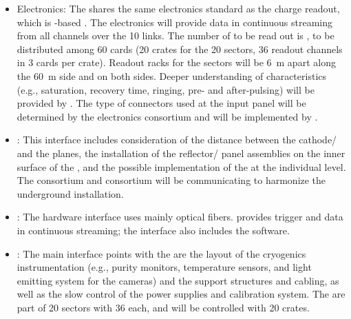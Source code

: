 
\begin{itemize}

\item {} Electronics: The  shares the same  electronics standard as the charge readout, which is -based \cite{utca}. The  electronics will provide data in continuous streaming %
from all  channels over the \SI{10}{\Gbps} links. The number of %
to be read out is \dpnumpmtch, to be distributed among \num{60}  cards (\num{20}  crates for the \num{20}  sectors, \num{36} readout channels in \num{3}  cards per crate). Readout racks for the sectors will be \SI{6}{\m} apart along the \SI{60}{\m} side and on both sides. Deeper understanding of  characteristics
 (e.g., saturation, recovery time, ringing, pre- and after-pulsing) will be provided by  . The type of connectors used at the  input panel will be determined by the  electronics consortium and will be implemented by  .

\item {}: This interface includes consideration of the distance between the cathode/ and the  planes, the installation of the reflector/ panel assemblies on the inner surface of the , and the possible implementation of the  at the individual  level. The  consortium and  consortium will be communicating to harmonize the underground installation.

\item {}: The hardware interface uses mainly optical fibers.   provides trigger and data in continuous streaming;  the interface also includes the  software.

\item {}: The main interface points with the  are the layout of the cryogenics instrumentation (e.g., purity monitors, temperature sensors, and light emitting system for the cameras) and the  support structures and cabling, as well as the slow control of the  power supplies and calibration system. The   are part of \num{20} sectors with \num{36}  each, and will be controlled with \num{20}  crates.


\end{itemize}
